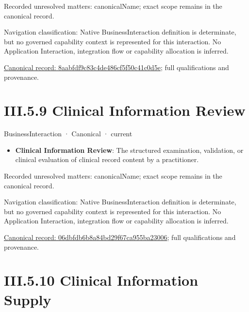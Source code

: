 {\small Recorded unresolved matters: canonicalName; exact scope remains in the canonical record.}\par
{\small Navigation classification: Native BusinessInteraction definition is determinate, but no governed capability context is represented for this interaction. No Application Interaction, integration flow or capability allocation is inferred.}\par
{\footnotesize \href{../../../../../../../../continuum/business/business-interaction/8aabfdf9c83c4de486cf5f50c41c0d5e.md}{Canonical record: 8aabfdf9c83c4de486cf5f50c41c0d5e}; full qualifications and provenance.}\par
\section*{III.5.9 Clinical Information Review}
\label{navigation:III.5.9}

\label{element:06dbfdb6b8a84bd29f67ca955ba23006}
{\small BusinessInteraction · Canonical · current}\par

\begin{itemize}


\item \textbf{Clinical Information Review}: The structured examination, validation, or clinical evaluation of clinical record content by a practitioner.

\end{itemize}

{\small Recorded unresolved matters: canonicalName; exact scope remains in the canonical record.}\par
{\small Navigation classification: Native BusinessInteraction definition is determinate, but no governed capability context is represented for this interaction. No Application Interaction, integration flow or capability allocation is inferred.}\par
{\footnotesize \href{../../../../../../../../continuum/business/business-interaction/06dbfdb6b8a84bd29f67ca955ba23006.md}{Canonical record: 06dbfdb6b8a84bd29f67ca955ba23006}; full qualifications and provenance.}\par
\section*{III.5.10 Clinical Information Supply}
\label{navigation:III.5.10}

